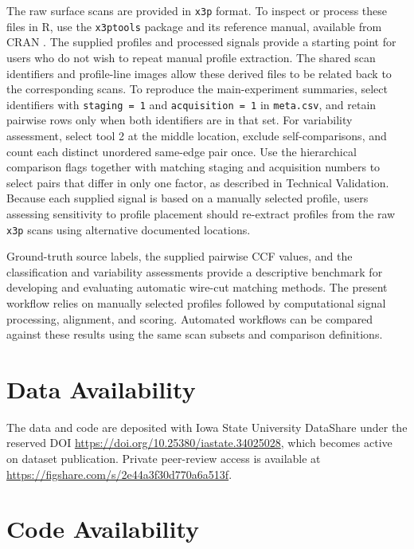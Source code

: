 \documentclass[11pt,a4paper]{article}
\begin{document}
The raw surface scans are provided in \texttt{x3p} format. To inspect or
process these files in R, use the \texttt{x3ptools} package and its
reference manual, available from CRAN
\citep{hofmannX3ptoolsToolsWorking2018}. The supplied profiles and
processed signals provide a starting point for users who do not wish to
repeat manual profile extraction. The shared scan identifiers and
profile-line images allow these derived files to be related back to the
corresponding scans. To reproduce the main-experiment summaries, select
identifiers with \texttt{staging = 1} and \texttt{acquisition = 1} in
\texttt{meta.csv}, and retain pairwise rows only when both identifiers
are in that set. For variability assessment, select tool 2 at the middle
location, exclude self-comparisons, and count each distinct unordered
same-edge pair once. Use the hierarchical comparison flags together with
matching staging and acquisition numbers to select pairs that differ in
only one factor, as described in Technical Validation. Because each
supplied signal is based on a manually selected profile, users assessing
sensitivity to profile placement should re-extract profiles from the raw
\texttt{x3p} scans using alternative documented locations.

Ground-truth source labels, the supplied pairwise CCF values, and the
classification and variability assessments provide a descriptive
benchmark for developing and evaluating automatic wire-cut matching
methods. The present workflow relies on manually selected profiles
followed by computational signal processing, alignment, and scoring.
Automated workflows can be compared against these results using the same
scan subsets and comparison definitions.

\section*{Data Availability}\label{sec-data-availability}

The data and code are deposited with Iowa State University DataShare
\citep{DatasetCodeThreedimensionalDataWirecut} under the reserved DOI
\url{https://doi.org/10.25380/iastate.34025028}, which becomes active on
dataset publication. Private peer-review access is available at
\url{https://figshare.com/s/2e44a3f30d770a6a513f}.

\section*{Code Availability}\label{sec-code-availability}
\end{document}
